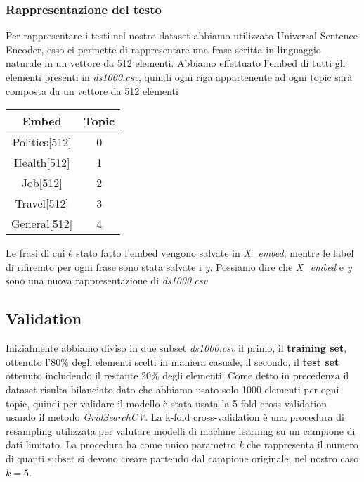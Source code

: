 \subsubsection{Rappresentazione del testo}
\label{sssec:rappresentazione}
Per rappresentare i testi nel nostro dataset abbiamo utilizzato Universal Sentence Encoder, esso ci permette di rappresentare una frase scritta in linguaggio naturale in un vettore da 512 elementi.\newline
Abbiamo effettuato l'embed di tutti gli elementi presenti in \textit{ds1000.csv}, quindi ogni riga appartenente ad ogni topic sarà composta da un vettore da 512 elementi
\FloatBarrier
\begin{table}[h]
\centering
\begin{tabular}{|c|c|}
\hline
\textbf{Embed} & \textbf{Topic} \\ \hline
Politics{[}512{]} & 0 \\ \hline
Health{[}512{]} & 1 \\ \hline
Job{[}512{]} & 2 \\ \hline
Travel{[}512{]} & 3 \\ \hline
General{[}512{]} & 4 \\ \hline
\end{tabular}
\end{table}
Le frasi di cui è stato fatto l'embed vengono salvate in \textit{X\_embed}, mentre le label di rifiremto per ogni frase sono stata salvate i \textit{y}. Possiamo dire che \textit{X\_embed} e \textit{y} sono una nuova rappresentazione di \textit{ds1000.csv}

\subsection{Validation}
Inizialmente abbiamo diviso in due subset \textit{ds1000.csv} il primo, il \textbf{training set}, ottenuto l'80\% degli elementi scelti in maniera casuale, il secondo, il \textbf{test set} ottenuto includendo il restante 20\% degli elementi.\newline
Come detto in precedenza il dataset risulta bilanciato dato che abbiamo usato solo 1000 elementi per ogni topic, quindi per validare il modello è stata usata la 5-fold cross-validation usando il metodo \textit{GridSearchCV}.\newline
La k-fold cross-validation è una procedura di resampling utilizzata per valutare modelli di machine learning su un campione di dati limitato. La procedura ha come unico parametro \textit{k} che rappresenta il numero di quanti subset si devono creare partendo dal campione originale, nel nostro caso $ k = 5 $.
\begin{comment}
Divisione dataset 80 20
K fold cross validation 
rf si basa principalmente su numero stimatori. Abbiamo provato da m a w.

tabella di quelli provati con risultato
\end{comment}
